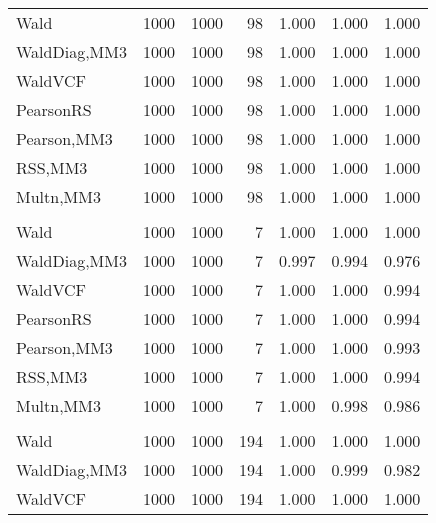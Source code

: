 \documentclass[
]{article}
\begin{document}
\begin{table}[H]
{\begin{tabular}[t]{lrrrrrr}
\hspace{1em}Wald & 1000 & 1000 & 98 & 1.000 & 1.000 & 1.000\\
\hspace{1em}WaldDiag,MM3 & 1000 & 1000 & 98 & 1.000 & 1.000 & 1.000\\
\hspace{1em}WaldVCF & 1000 & 1000 & 98 & 1.000 & 1.000 & 1.000\\
\hspace{1em}PearsonRS & 1000 & 1000 & 98 & 1.000 & 1.000 & 1.000\\
\hspace{1em}Pearson,MM3 & 1000 & 1000 & 98 & 1.000 & 1.000 & 1.000\\
\hspace{1em}RSS,MM3 & 1000 & 1000 & 98 & 1.000 & 1.000 & 1.000\\
\hspace{1em}Multn,MM3 & 1000 & 1000 & 98 & 1.000 & 1.000 & 1.000\\
\addlinespace[0.3em]
\multicolumn{7}{l}{\textbf{2F 10V}}\\
\hspace{1em}Wald & 1000 & 1000 & 7 & 1.000 & 1.000 & 1.000\\
\hspace{1em}WaldDiag,MM3 & 1000 & 1000 & 7 & 0.997 & 0.994 & 0.976\\
\hspace{1em}WaldVCF & 1000 & 1000 & 7 & 1.000 & 1.000 & 0.994\\
\hspace{1em}PearsonRS & 1000 & 1000 & 7 & 1.000 & 1.000 & 0.994\\
\hspace{1em}Pearson,MM3 & 1000 & 1000 & 7 & 1.000 & 1.000 & 0.993\\
\hspace{1em}RSS,MM3 & 1000 & 1000 & 7 & 1.000 & 1.000 & 0.994\\
\hspace{1em}Multn,MM3 & 1000 & 1000 & 7 & 1.000 & 0.998 & 0.986\\
\addlinespace[0.3em]
\multicolumn{7}{l}{\textbf{3F 15V}}\\
\hspace{1em}Wald & 1000 & 1000 & 194 & 1.000 & 1.000 & 1.000\\
\hspace{1em}WaldDiag,MM3 & 1000 & 1000 & 194 & 1.000 & 0.999 & 0.982\\
\hspace{1em}WaldVCF & 1000 & 1000 & 194 & 1.000 & 1.000 & 1.000\\

\end{tabular}}
\end{table}
\end{document}
